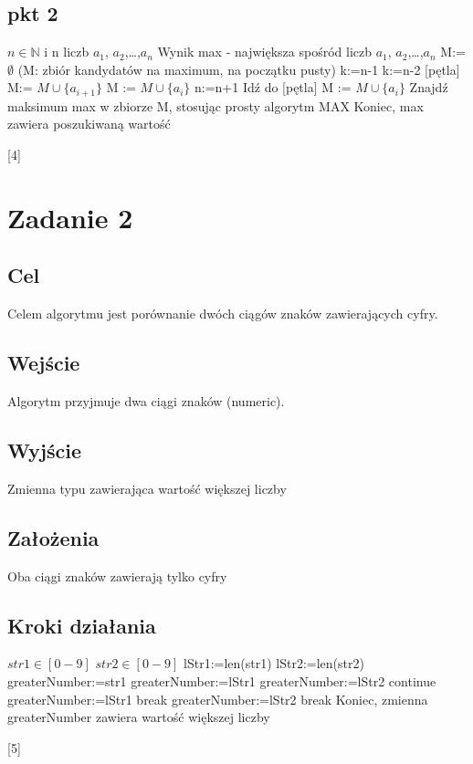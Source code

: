 \documentclass{article}
\begin{document}
			\subsection{pkt 2}
				\begin{algorithmic}[4]
					\Require $n \in \mathbb{N}$ i n liczb \(a_1\), \(a_2\),\dots,\(a_n\) 
					\State Wynik max - największa spośród liczb
					\(a_1\), \(a_2\),\dots,\(a_n\) 
					\State M:=$\emptyset$ (M: zbiór kandydatów na maximum, na początku pusty)
					\State k:=n-1
					\Else
					\State k:=n-2
					\EndIf
					[pętla]
					\State M:= $M \cup \{a_{i+1}\}$
					\Else
					\State M := $M \cup \{a_i\}$	
					\EndIf
					\EndIf
					\State n:=n+1
					\State Idź do [pętla]
					\EndIf
					\State M := $M \cup \{a_i\}$
					\EndIf
					\State Znajdź maksimum max w zbiorze M, stosując prosty algorytm MAX
					\State Koniec, max zawiera poszukiwaną wartość
				\end{algorithmic}[4]
		\section{Zadanie 2}
			\subsection{Cel}
				Celem algorytmu jest porównanie dwóch ciągów znaków zawierających cyfry.
			\subsection{Wejście}
				Algorytm przyjmuje dwa ciągi znaków (numeric).
			\subsection{Wyjście}
				Zmienna typu zawierająca wartość większej liczby
			\subsection{Założenia}
				Oba ciągi znaków zawierają tylko cyfry
			\subsection{Kroki działania}
				\begin{algorithmic}[5]
					\Require $str1 \in [0-9]$
					\Require $str2 \in [0-9]$
					\State lStr1:=len(str1)
					\State lStr2:=len(str2)
					\State greaterNumber:=str1
					\State greaterNumber:=lStr1
					\State greaterNumber:=lStr2
					\State continue
					\State greaterNumber:=lStr1
					\State break
					\State greaterNumber:=lStr2
					\State break
					\EndIf
					\EndFor
					\EndIf
					\State Koniec, zmienna greaterNumber zawiera wartość większej liczby
				\end{algorithmic}[5]
\end{document}
